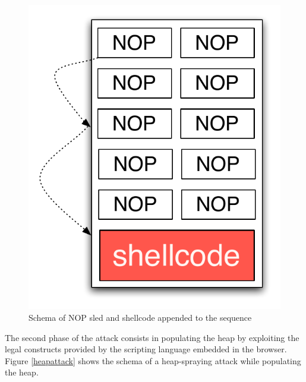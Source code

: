 \begin{figure}[htbp] 
\begin{center}
\includegraphics[scale=0.35]{images/nop_shellcode}
\caption{{Schema of NOP sled and shellcode appended to the sequence}}
\label{NOPfig}
\end{center}
\end{figure}

The second phase of the attack consists in populating the heap by exploiting the legal constructs provided by the scripting language embedded in the browser. Figure \ref{heapattack} shows the schema of a heap-spraying attack while populating the  heap.

